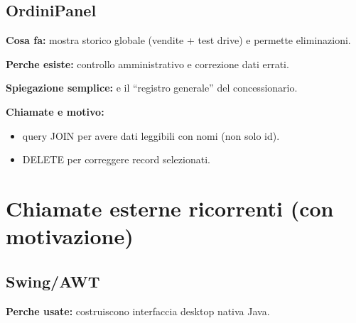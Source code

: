 \documentclass[12pt,a4paper]{article}
\begin{document}
\subsection{OrdiniPanel}
\textbf{Cosa fa:} mostra storico globale (vendite + test drive) e permette eliminazioni.

\textbf{Perche esiste:} controllo amministrativo e correzione dati errati.

\textbf{Spiegazione semplice:} e il ``registro generale'' del concessionario.

\textbf{Chiamate e motivo:}
\begin{itemize}
  \item query JOIN per avere dati leggibili con nomi (non solo id).
  \item DELETE per correggere record selezionati.
\end{itemize}

\section{Chiamate esterne ricorrenti (con motivazione)}

\subsection{Swing/AWT}
\textbf{Perche usate:} costruiscono interfaccia desktop nativa Java.
\end{document}
